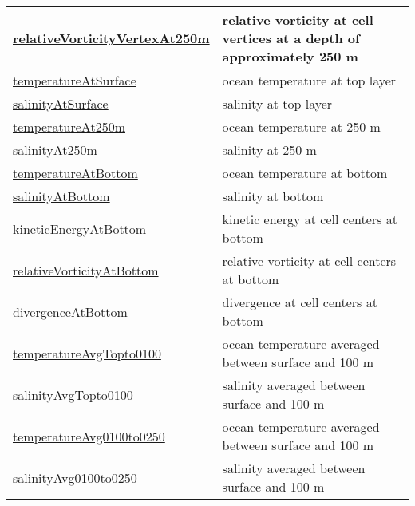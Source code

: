 {\begin{center}
\begin{longtable}{| p{2.0in} | p{4.0in} |}
    \hline
    \hyperref[subsec:var_sec_highFrequencyOutputAM_relativeVorticityVertexAt250m]{relativeVorticityVertexAt250m} & relative vorticity at cell vertices at a depth of approximately 250 m \\
    \hline
    \hyperref[subsec:var_sec_highFrequencyOutputAM_temperatureAtSurface]{temperatureAtSurface} & ocean temperature at top layer \\
    \hline
    \hyperref[subsec:var_sec_highFrequencyOutputAM_salinityAtSurface]{salinityAtSurface} & salinity at top layer \\
    \hline
    \hyperref[subsec:var_sec_highFrequencyOutputAM_temperatureAt250m]{temperatureAt250m} & ocean temperature at 250 m \\
    \hline
    \hyperref[subsec:var_sec_highFrequencyOutputAM_salinityAt250m]{salinityAt250m} & salinity at 250 m \\
    \hline
    \hyperref[subsec:var_sec_highFrequencyOutputAM_temperatureAtBottom]{temperatureAtBottom} & ocean temperature at bottom \\
    \hline
    \hyperref[subsec:var_sec_highFrequencyOutputAM_salinityAtBottom]{salinityAtBottom} & salinity at bottom \\
    \hline
    \hyperref[subsec:var_sec_highFrequencyOutputAM_kineticEnergyAtBottom]{kineticEnergyAtBottom} & kinetic energy at cell centers at bottom \\
    \hline
    \hyperref[subsec:var_sec_highFrequencyOutputAM_relativeVorticityAtBottom]{relativeVorticityAtBottom} & relative vorticity at cell centers at bottom \\
    \hline
    \hyperref[subsec:var_sec_highFrequencyOutputAM_divergenceAtBottom]{divergenceAtBottom} & divergence at cell centers at bottom \\
    \hline
    \hyperref[subsec:var_sec_highFrequencyOutputAM_temperatureAvgTopto0100]{temperatureAvgTopto0100} & ocean temperature averaged between surface and 100 m \\
    \hline
    \hyperref[subsec:var_sec_highFrequencyOutputAM_salinityAvgTopto0100]{salinityAvgTopto0100} & salinity averaged between surface and 100 m \\
    \hline
    \hyperref[subsec:var_sec_highFrequencyOutputAM_temperatureAvg0100to0250]{temperatureAvg0100to0250} & ocean temperature averaged between surface and 100 m \\
    \hline
    \hyperref[subsec:var_sec_highFrequencyOutputAM_salinityAvg0100to0250]{salinityAvg0100to0250} & salinity averaged between surface and 100 m \\

\end{longtable}
\end{center}}

